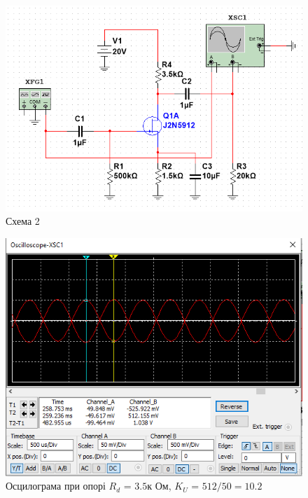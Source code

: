 \documentclass{article}
\begin{document}
\begin{normalsize}
	\begin{figure}[H]
		\centering
		\includegraphics[width=\textwidth]{2}
		\caption{Схема 2}
	\end{figure}
	
	\begin{figure}[H]
		\centering
		\includegraphics[width=\textwidth]{21}
		\caption{Осцилограма при опорі $R_d$ = $3.5$к Ом, $K_U$ = $512/50=10.2$}
	\end{figure}
	

\end{normalsize}
\end{document}
